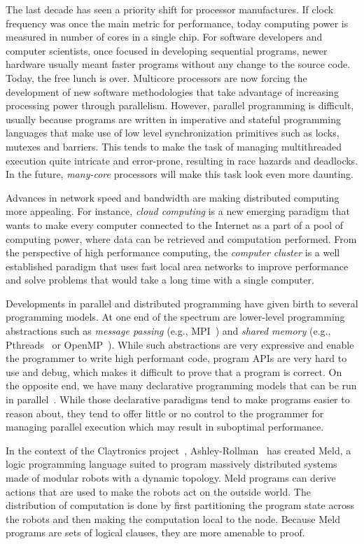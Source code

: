 
The last decade has seen a priority shift for processor manufactures. If clock frequency
was once the main metric for performance, today computing power is measured in number of
cores in a single chip.
For software developers and computer scientists, once focused in developing sequential programs,
newer hardware usually meant faster programs without any change to the source code. Today,
the free lunch is over. Multicore processors are now forcing the development of
new software methodologies that take advantage of increasing processing power through parallelism.
However, parallel programming is difficult, usually because programs are written
in imperative and stateful programming languages that make use of low level synchronization
primitives such as locks, mutexes and barriers. This tends to make the task of managing multithreaded
execution quite intricate and error-prone, resulting in race hazards and deadlocks.
In the future, \emph{many-core} processors will make this task look even more daunting.

Advances in network speed and bandwidth are making distributed computing
more appealing. For instance, \emph{cloud computing} is a new emerging paradigm that wants
to make every computer connected to the Internet as a part of a pool of computing power,
where data can be retrieved and computation performed. From the perspective of high performance
computing, the \emph{computer cluster} is a well established paradigm that uses fast local area
networks to improve performance and solve problems that would take a long time with a single computer.

Developments in parallel and distributed programming have given birth to several programming models.
At one end of the spectrum are lower-level programming abstractions such as
\emph{message passing} (e.g., MPI~\cite{gabriel04-open-mpi}) and \emph{shared memory}
(e.g., Pthreads~\cite{Butenhof:1997:PPT:263953} or OpenMP~\cite{Chapman-2007-UOP-1370966}).
While such abstractions are very expressive and enable the programmer to write high performant code,
program APIs are very hard to use and debug, which makes it difficult to prove that a program is correct.
On the opposite end, we have many declarative programming models
that can be run in parallel~\cite{Blelloch:1996:PPA:227234.227246}.
While those declarative paradigms tend to make programs easier to reason about, they tend to offer
little or no control to the programmer for managing parallel execution
which may result in suboptimal performance.

In the context of the Claytronics project~\cite{goldstein-computer05}, Ashley-Rollman~\cite{ashley-rollman-iclp09, ashley-rollman-derosa-iros07wksp}
has created Meld, a logic programming language suited to program massively distributed systems made of modular robots with a dynamic topology.
Meld programs can derive actions that are used
to make the robots act on the outside world. The distribution of computation is done
by first partitioning the program state across the robots and then making the computation local to the node. Because Meld programs
are sets of logical clauses, they are more amenable to proof.

